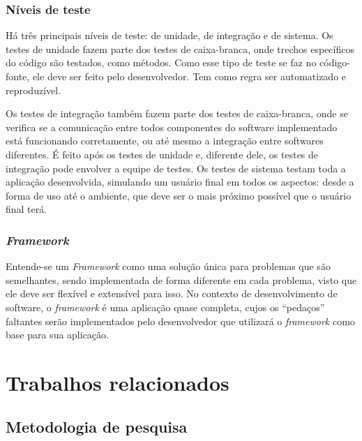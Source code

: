 \documentclass[twoside,english,brazilian]{UNISINOSartigo}
\begin{document}

\subsubsection{Níveis de teste}
Há três principais níveis de teste: de unidade, de integração e de sistema. Os testes de unidade fazem parte dos testes de caixa-branca, onde trechos específicos do código são testados, como métodos. Como esse tipo de teste se faz no código-fonte, ele deve ser feito pelo desenvolvedor. Tem como regra ser automatizado e reproduzível.

Os testes de integração também fazem parte dos testes de caixa-branca, onde se verifica se a comunicação entre todos componentes do software implementado está funcionando corretamente, ou até mesmo a integração entre softwares diferentes. É feito após os testes de unidade e, diferente dele, os testes de integração pode envolver a equipe de testes. Os testes de sistema testam toda a aplicação desenvolvida, simulando um usuário final em todos os aspectos: desde a forma de uso até o ambiente, que deve ser o mais próximo possível que o usuário final terá.


\subsubsection{\textit{Framework}}

Entende-se um \textit{Framework} como uma solução única para problemas que são semelhantes, sendo implementada de forma diferente em cada problema, visto que ele deve ser flexível e extensível para isso. No contexto de desenvolvimento de software, o \textit{framework} é uma aplicação quase completa, cujos os ``pedaços'' faltantes serão implementados pelo desenvolvedor que utilizará o \textit{framework} como base para sua aplicação. \cite{ufcg}


\section{Trabalhos relacionados}

\subsection{Metodologia de pesquisa}
\end{document}
